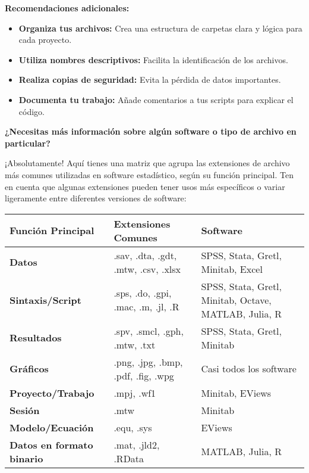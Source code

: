 \documentclass[
  stu,
  floatsintext,
  longtable,
  a4paper,
  nolmodern,
  notxfonts,
  notimes,
  colorlinks=true,linkcolor=blue,citecolor=blue,urlcolor=blue]{apa7}
\providecommand{\tightlist}{%
  \setlength{\itemsep}{0pt}\setlength{\parskip}{0pt}}
\begin{document}
\textbf{Recomendaciones adicionales:}

\begin{itemize}
\tightlist
\item
  \textbf{Organiza tus archivos:} Crea una estructura de carpetas clara
  y lógica para cada proyecto.
\item
  \textbf{Utiliza nombres descriptivos:} Facilita la identificación de
  los archivos.
\item
  \textbf{Realiza copias de seguridad:} Evita la pérdida de datos
  importantes.
\item
  \textbf{Documenta tu trabajo:} Añade comentarios a tus scripts para
  explicar el código.
\end{itemize}

\textbf{¿Necesitas más información sobre algún software o tipo de
archivo en particular?}

¡Absolutamente! Aquí tienes una matriz que agrupa las extensiones de
archivo más comunes utilizadas en software estadístico, según su función
principal. Ten en cuenta que algunas extensiones pueden tener usos más
específicos o variar ligeramente entre diferentes versiones de software:

\begin{longtable}[]{@{}
  >{\raggedright\arraybackslash}p{}
  >{\raggedright\arraybackslash}p{}
  >{\raggedright\arraybackslash}p{}@{}}
\toprule\noalign{}
\begin{minipage}[b]{\linewidth}\raggedright
Función Principal
\end{minipage} & \begin{minipage}[b]{\linewidth}\raggedright
Extensiones Comunes
\end{minipage} & \begin{minipage}[b]{\linewidth}\raggedright
Software
\end{minipage} \\
\midrule\noalign{}
\endhead
\bottomrule\noalign{}
\endlastfoot
\textbf{Datos} & .sav, .dta, .gdt, .mtw, .csv, .xlsx & SPSS, Stata,
Gretl, Minitab, Excel \\
\textbf{Sintaxis/Script} & .sps, .do, .gpi, .mac, .m, .jl, .R & SPSS,
Stata, Gretl, Minitab, Octave, MATLAB, Julia, R \\
\textbf{Resultados} & .spv, .smcl, .gph, .mtw, .txt & SPSS, Stata,
Gretl, Minitab \\
\textbf{Gráficos} & .png, .jpg, .bmp, .pdf, .fig, .wpg & Casi todos los
software \\
\textbf{Proyecto/Trabajo} & .mpj, .wf1 & Minitab, EViews \\
\textbf{Sesión} & .mtw & Minitab \\
\textbf{Modelo/Ecuación} & .equ, .sys & EViews \\
\textbf{Datos en formato binario} & .mat, .jld2, .RData & MATLAB, Julia,
R \\
\end{longtable}
\end{document}
